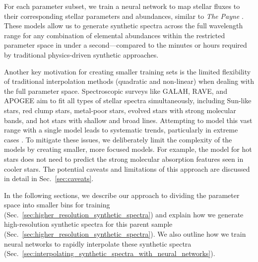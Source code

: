 \documentclass[
  journal=pasa,
  manuscript=research-paper, %
  year=2024,
  volume=37
]{cup-journal}
\begin{document}
For each parameter subset, we train a neural network to map stellar fluxes to their corresponding stellar parameters and abundances, similar to \textit{The Payne} \citep{Ting2019}. These models allow us to generate synthetic spectra across the full wavelength range for any combination of elemental abundances within the restricted parameter space in under a second—compared to the minutes or hours required by traditional physics-driven synthetic approaches.

Another key motivation for creating smaller training sets is the limited flexibility of traditional interpolation methods (quadratic and non-linear) when dealing with the full parameter space. Spectroscopic surveys like GALAH, RAVE, and APOGEE aim to fit all types of stellar spectra simultaneously, including Sun-like stars, red clump stars, metal-poor stars, evolved stars with strong molecular bands, and hot stars with shallow and broad lines. Attempting to model this vast range with a single model leads to systematic trends, particularly in extreme cases \citep{Casey2016, Buder2018, Ting2019}. To mitigate these issues, we deliberately limit the complexity of the models by creating smaller, more focused models. For example, the model for hot stars does not need to predict the strong molecular absorption features seen in cooler stars. The potential caveats and limitations of this approach are discussed in detail in Sec.~\ref{sec:caveats}.

In the following sections, we describe our approach to dividing the parameter space into smaller bins for training (Sec.~\ref{sec:higher_resolution_synthetic_spectra}) and explain how we generate high-resolution synthetic spectra for this parent sample (Sec.~\ref{sec:higher_resolution_synthetic_spectra}). We also outline how we train neural networks to rapidly interpolate these synthetic spectra (Sec.~\ref{sec:interpolating_synthetic_spectra_with_neural_networks}).
\end{document}
